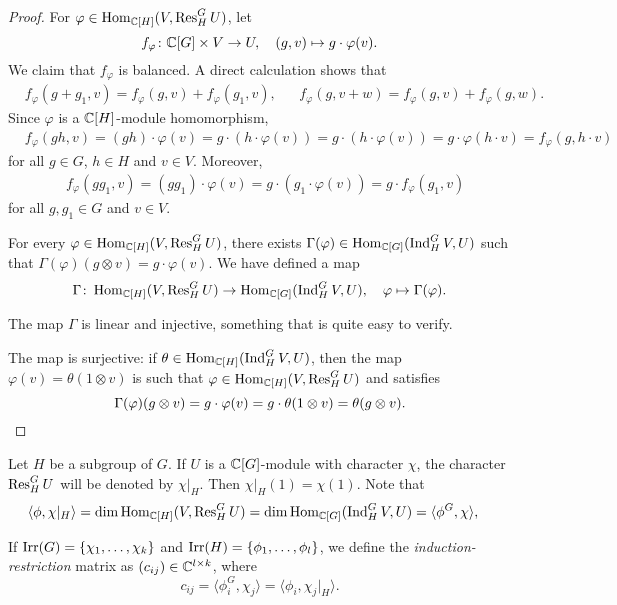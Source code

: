 \begin{proof}
For $\varphi\in\operatorname{Hom}_{\mathbb{C}[H]}(V,\operatorname{Res}_H^GU)$, let 
\[
f_{\varphi}\colon \mathbb{C}[G]\times V\to U,
\quad
(g,v)\mapsto g\cdot\varphi(v).
\]
We claim that $f_{\varphi}$ is balanced. A direct calculation shows that 
\begin{align*}
    &f_{\varphi}(g+g_1,v)=f_{\varphi}(g,v)+f_{\varphi}(g_1,v),&&
    f_{\varphi}(g,v+w)=f_{\varphi}(g,v)+f_{\varphi}(g,w).
\end{align*}
Since $\varphi$ is a $\mathbb{C}[H]$-module homomorphism,
\begin{align*}
    &f_{\varphi}(gh,v)=(gh)\cdot\varphi(v)
    =g\cdot (h\cdot \varphi(v))
    =g\cdot (h\cdot\varphi(v))
    =g\cdot \varphi(h\cdot v)=f_{\varphi}(g,h\cdot v)
\end{align*}
for all $g\in G$, $h\in H$ and $v\in V$. Moreover, 
\begin{align*}
    &f_{\varphi}(gg_1,v)=(gg_1)\cdot\varphi(v)=g\cdot(g_1\cdot\varphi(v))=g\cdot f_{\varphi}(g_1,v)
\end{align*}
for all $g,g_1\in G$ and $v\in V$. 

For every $\varphi\in\operatorname{Hom}_{\mathbb{C}[H]}(V,\operatorname{Res}_H^GU)$, there exists 
$\Gamma(\varphi)\in\operatorname{Hom}_{\mathbb{C}[G]}(\operatorname{Ind}_H^GV,U)$ such that 
$\Gamma(\varphi)(g\otimes v)=g\cdot\varphi(v)$. 
We have defined a map  
\[
\Gamma\colon \operatorname{Hom}_{\mathbb{C}[H]}(V,\operatorname{Res}_H^GU)\to\operatorname{Hom}_{\mathbb{C}[G]}(\operatorname{Ind}_H^GV,U),
\quad
\varphi\mapsto\Gamma(\varphi).
\]

The map $\Gamma$ is linear and injective, something that is quite easy to verify. 

The map is surjective: if $\theta\in\operatorname{Hom}_{\mathbb{C}[H]}(\operatorname{Ind}_H^GV,U)$, then
the map $\varphi(v)=\theta(1\otimes v)$ is such that $\varphi\in\operatorname{Hom}_{\mathbb{C}[H]}(V,\operatorname{Res}_H^GU)$ and satisfies 
\[
\Gamma(\varphi)(g\otimes v)=g\cdot\varphi(v)=g\cdot\theta(1\otimes v)=\theta(g\otimes v).\qedhere
\]
\end{proof}


Let $H$ be a subgroup of $G$. If $U$ is a $\mathbb{C}[G]$-module with character $\chi$, the character $\operatorname{Res}_H^GU$ will be denoted by $\chi|_H$. Then $\chi|_H(1)=\chi(1)$. Note that 
\begin{align*}
\langle \phi,\chi|_H\rangle
&=\dim\operatorname{Hom}_{\mathbb{C}[H]}(V,\operatorname{Res}_H^GU)
=\dim\operatorname{Hom}_{\mathbb{C}[G]}(\operatorname{Ind}_H^GV,U)
=\langle\phi^G,\chi\rangle,
\end{align*}


\begin{definition}
If $\operatorname{Irr}(G)=\{\chi_1,\dots,\chi_k\}$ and $\operatorname{Irr}(H)=\{\phi_1,\dots,\phi_l\}$, we define the \emph{induction-restriction} matrix as $(c_{ij})\in\mathbb{C}^{l\times k}$, where 
\[
c_{ij}=\langle \phi_i^G,\chi_j\rangle=\langle\phi_i,\chi_j|_H\rangle.
\]
\end{definition}

